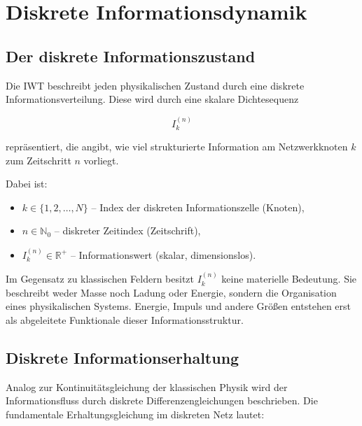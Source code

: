 
\chapter{Diskrete Informationsdynamik}
\label{ch:diskrete_informationsdynamik}

\section{Der diskrete Informationszustand}
\label{sec:diskreter_informationszustand}

Die IWT beschreibt jeden physikalischen Zustand durch eine diskrete Informationsverteilung. Diese wird durch eine skalare Dichtesequenz

\[
I_k^{(n)}
\]

repräsentiert, die angibt, wie viel strukturierte Information am Netzwerkknoten \( k \) zum Zeitschritt \( n \) vorliegt.

Dabei ist:

\begin{itemize}
    \item \( k \in \{1, 2, \dots, N\} \) – Index der diskreten Informationszelle (Knoten),
    \item \( n \in \mathbb{N}_0 \) – diskreter Zeitindex (Zeitschrift),
    \item \( I_k^{(n)} \in \mathbb{R}^+ \) – Informationswert (skalar, dimensionslos).
\end{itemize}

Im Gegensatz zu klassischen Feldern besitzt \( I_k^{(n)} \) keine materielle Bedeutung. Sie beschreibt weder Masse noch Ladung oder Energie, sondern die Organisation eines physikalischen Systems. Energie, Impuls und andere Größen entstehen erst als abgeleitete Funktionale dieser Informationsstruktur.

\section{Diskrete Informationserhaltung}
\label{sec:diskrete_informationserhaltung}

Analog zur Kontinuitätsgleichung der klassischen Physik wird der Informationsfluss durch diskrete Differenzengleichungen beschrieben. Die fundamentale Erhaltungsgleichung im diskreten Netz lautet:


